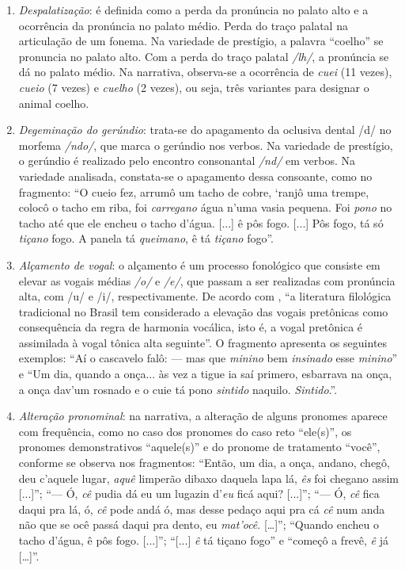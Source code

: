 \documentclass[portuguese]{textolivre}
\begin{document}
\begin{enumerate}[label=\alph*.]
    \item \textit{Despalatização}: é definida como a perda da pronúncia no palato alto e a ocorrência da pronúncia no palato médio. Perda do traço palatal na articulação de um fonema. Na variedade de prestígio, a palavra “coelho” se pronuncia no palato alto. Com a perda do traço palatal \textit{/lh/}, a pronúncia se dá no palato médio. Na narrativa, observa-se a ocorrência de \textit{cuei} (11 vezes), \textit{cueio} (7 vezes) e \textit{cuelho} (2 vezes), ou seja, três variantes para designar o animal coelho.
    \item \textit{Degeminação do gerúndio}: trata-se do apagamento da oclusiva dental /d/ no morfema \textit{/ndo/}, que marca o gerúndio nos verbos. Na variedade de prestígio, o gerúndio é realizado pelo encontro consonantal \textit{/nd/} em verbos. Na variedade analisada, constata-se o apagamento dessa consoante, como no fragmento: “O cueio fez, arrumô um tacho de cobre, ‘ranjô uma trempe, colocô o tacho em riba, foi \textit{carregano} água n’uma vasia pequena. Foi \textit{pono} no tacho até que ele encheu o tacho d’água. [...] ê pôs fogo. [...] Pôs fogo, tá só \textit{tiçano} fogo. A panela tá \textit{queimano}, ê tá \textit{tiçano} fogo”.
    \item \textit{Alçamento de vogal}: o alçamento é um processo fonológico que consiste em elevar as vogais médias \textit{/o/} e \textit{/e/}, que passam a ser realizadas com pronúncia alta, com /u/ e /i/, respectivamente. De acordo com \textcite[p. 48]{BortoniRicardo2011} , “a literatura filológica tradicional no Brasil tem considerado a elevação das vogais pretônicas como consequência da regra de harmonia vocálica, isto é, a vogal pretônica é assimilada à vogal tônica alta seguinte”. O fragmento apresenta os seguintes exemplos: “Aí o cascavelo falô: — mas que \textit{minino} bem \textit{insinado} esse \textit{minino}” e “Um dia, quando a onça... às vez a tigue ia saí primero, esbarrava na onça, a onça dav’um rosnado e o cuie tá pono \textit{sintido} naquilo. \textit{Sintido}.”.
    \item \textit{Alteração pronominal}: na narrativa, a alteração de alguns pronomes aparece com frequência, como no caso dos pronomes do caso reto “ele(s)”, os pronomes demonstrativos “aquele(s)” e do pronome de tratamento “você”, conforme se observa nos fragmentos: “Então, um dia, a onça, andano, chegô, deu c’aquele lugar, \textit{aquê} limperão dibaxo daquela lapa lá, \textit{ês} foi chegano assim [...]”; “— Ó, \textit{cê} pudia dá eu um lugazin d’\textit{eu} ficá aqui? [...]”; “— Ó, \textit{cê} fica daqui pra lá, ó, \textit{cê} pode andá ó, mas desse pedaço aqui pra cá \textit{cê} num anda não que se ocê passá daqui pra dento, eu \textit{mat’ocê}. […]”; “Quando encheu o tacho d’água, ê pôs fogo. [...]”; “[...] \textit{ê} tá tiçano fogo” e “começô a frevê, \textit{ê} já […]”.
\end{enumerate}
    
\end{document}
